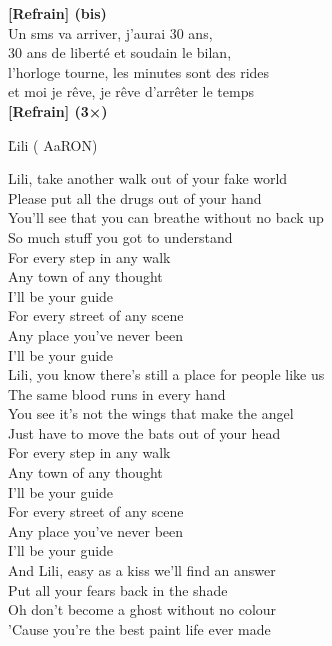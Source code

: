 \documentclass{novel}
\begin{document}
\textbf{[Refrain] (bis)}\\

Un sms va arriver, j'aurai 30 ans, \\
30 ans de liberté et soudain le bilan, \\
l'horloge tourne, les minutes sont des rides \\

et moi je rêve, je rêve d'arrêter le temps \\
\textbf{[Refrain] (3×)}

\newpage
\small
\h*{Lili ( AaRON)}

Lili, take another walk out of your fake world \\
Please put all the drugs out of your hand \\
You'll see that you can breathe without no back up \\
So much stuff you got to understand \\

For every step in any walk \\
Any town of any thought \\
I'll be your guide \\
For every street of any scene \\
Any place you've never been \\
I'll be your guide \\

Lili, you know there's still a place for people like us \\
The same blood runs in every hand \\
You see it's not the wings that make the angel \\
Just have to move the bats out of your head \\

For every step in any walk \\
Any town of any thought \\
I'll be your guide \\

For every street of any scene \\
Any place you've never been \\
I'll be your guide \\

And Lili, easy as a kiss we'll find an answer \\
Put all your fears back in the shade \\
Oh don't become a ghost without no colour \\
'Cause you're the best paint life ever made \\
\end{document}
